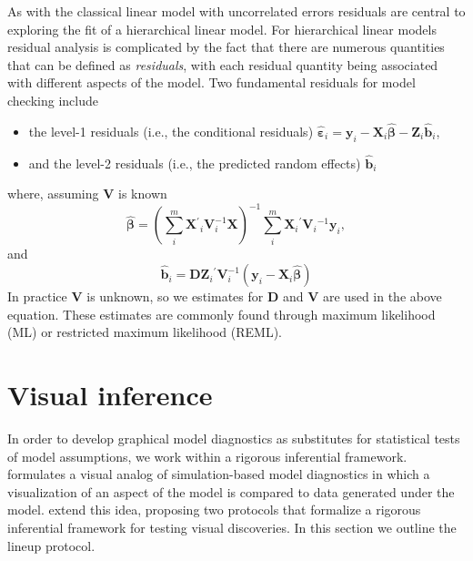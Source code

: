 \documentclass{article} %
\newcommand{\inv}{\ensuremath{^{-1}}}
\newcommand{\trans}{\ensuremath{^\prime}}
\begin{document}
As with the classical linear model with uncorrelated errors residuals are central to exploring the fit of a hierarchical linear model. For hierarchical linear models residual analysis is complicated by the fact that there are numerous quantities that can be defined as \emph{residuals}, with each residual quantity being associated with different aspects of the model. Two fundamental residuals for model checking include
%
\begin{itemize}
\item the level-1 residuals (i.e., the conditional residuals) $\widehat{\bm{\varepsilon}}_i = \bm{y}_i - \bm{X}_i \widehat{\bm{\beta}} - \bm{Z}_i \widehat{\bm{b}}_i$,

\item and the level-2 residuals (i.e., the predicted random effects) $\widehat{\bm{b}}_i$
\end{itemize}
%
where, assuming $\bm{V}$ is known
\begin{equation}\label{eq:glsb}
	\widehat{\bm{\beta}} = 
	\left(\sum^m_i \bm{X}\trans_i \bm{V}^{-1}_i \bm{X} \right)^{-1} 
	\sum^m_i \bm{X}_i\trans \bm{V}_i\inv \bm{y}_i,
\end{equation}
and
\begin{equation}\label{eq:eb}
	\widehat{\bm{b}}_i = \bm{D} \bm{Z}_i\trans \bm{V}_i^{-1} 
	\left(\bm{y}_i - \bm{X}_i \widehat{\bm{\beta}} \right)
\end{equation}
%
In practice $\bm{V}$ is unknown, so we estimates for $\bm{D}$ and $\bm{V}$ are used in the above equation. These estimates are commonly found through maximum likelihood (ML) or restricted maximum likelihood (REML).



\section{Visual inference}\label{sec:vi}
In order to develop graphical model diagnostics as substitutes for statistical tests of model assumptions, we work within a rigorous inferential framework. \cite{Gelman:2004gg} formulates a visual analog of simulation-based model diagnostics in which a visualization of an aspect of the model is compared to data generated under the model. \cite{Buja:2009hp} extend this idea, proposing two protocols that formalize a rigorous inferential framework for testing visual discoveries. In this section we outline the lineup protocol.
\end{document}
